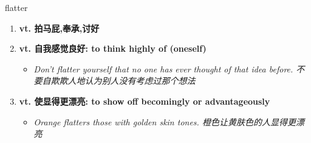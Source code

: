 
\begin{frame}
{\huge flatter}
\begin{center}
\begin{enumerate}\Large
  \item \textbf{vt. 拍马屁,奉承,讨好}
  \item \textbf{vt. 自我感觉良好: to think highly of (oneself)}
  \begin{itemize}
    \item \em{\Large{Don't flatter yourself that no one has ever thought of that idea before. 不要自欺欺人地认为别人没有考虑过那个想法}}
  \end{itemize}
  \item \textbf{vt. 使显得更漂亮: to show off becomingly or advantageously}
  \begin{itemize}
    \item \em{\Large{Orange flatters those with golden skin tones. 橙色让黄肤色的人显得更漂亮}}
  \end{itemize}
\end{enumerate}
\end{center}
\end{frame}
